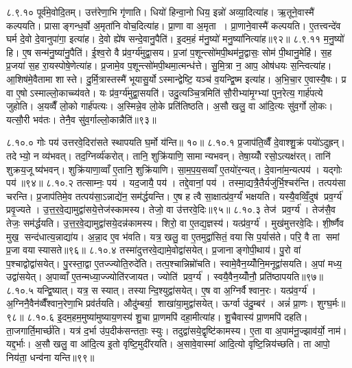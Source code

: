 ८.९.१०
पूर्व॑मे॒वोदि॒तम्। उत्त॑रेणा॒भि गृ॑णाति। धियो॑ हिन्वा॒नो धिय॒ इन्नो॑ अव्या॒दित्या॑ह। ऋ॒तूने॒वास्मै॑ कल्पयति। प्रासाङ्गन्ध॒र्वो अ॒मृता॑नि वोच॒दित्या॑ह। प्रा॒णा वा अ॒मृता। प्रा॒णाने॒वास्मै॑ कल्पयति। ए॒तत्त्वन्दे॑व घर्म दे॒वो दे॒वानुपा॑गा॒ इत्या॑ह। दे॒वो ह्ये॑ष सन्दे॒वानु॒पैति॑। इ॒दम॒हं म॑नु॒ष्यो॑ मनु॒ष्या॑नित्या॑ह॥९२॥
८.९.११
म॒नु॒ष्यो॑ हि। ए॒ष सन्म॑नु॒ष्या॑नु॒पैति॑। ई॒श्व॒रो वै प्र॑व॒र्ग्य॑मुद्वा॒सय\sn{}। प्र॒जां प॒शून्त्सो॑मपी॒थम॑नू॒द्वासः॒ सोम॑ पी॒थानु॒मेहि॑। स॒ह प्र॒जया॑ स॒ह रा॒यस्पोषे॒णेत्या॑ह। प्र॒जामे॒व प॒शून्त्सो॑मपी॒थमा॒त्मन्ध॑त्ते। सु॒मि॒त्रा न॒ आप॒ ओष॑धयः स॒न्त्वित्या॑ह। आ॒शिष॑मे॒वैतामा शास्ते। दु॒र्मि॒त्रास्तस्मै॑ भूयासु॒र्योऽस्मान्द्वेष्टि॒ यञ्च॑ व॒यन्द्वि॒ष्म इत्या॑ह। अ॒भि॒चा॒र ए॒वास्यै॒षः। प्र वा ए॒षोऽस्माल्लो॒काच्च्य॑वते। यः प्र॑व॒र्ग्य॑मुद्वा॒सयति॑। उदु॒त्यञ्चि॒त्रमिति॑ सौ॒रीभ्या॑मृ॒ग्भ्यां पुन॒रेत्य॒ गार्\mbox{}ह॑पत्ये जुहोति। अ॒यव्वैँ लो॒को गार्\mbox{}ह॑पत्यः। अ॒स्मिन्ने॒व लो॒के प्रति॑तिष्ठति। अ॒सौ खलु॒ वा आ॑दि॒त्यः सु॑व॒र्गो लो॒कः। यत्सौ॒री भव॑तः। तेनै॒व सु॑व॒र्गाल्लो॒कान्नैति॑॥९३॥
\anuvakamend

८.१०.०
गोः पय॑ उत्तरवे॒दिरा॑सते स्थापयति घ॒र्मो य॑न्ति॥ १०॥
८.१०.१
प्र॒जाप॑ति॒व्वैँ दे॒वाश्शु॒क्रं पयो॑ऽदुह्रन्। तदेभ्यो॒ न व्य॑भवत्। तद॒ग्निर्व्य॑करोत्। तानि॒ शुक्रि॑याणि॒ सामान्यभवन्। तेषा॒य्योँ रसो॒ऽत्यक्ष॑रत्। तानि॑ शुक्रय॒जूष्य॑भवन्। शुक्रि॑याणा॒व्वाँ ए॒तानि॒ शुक्रि॑याणि। सा॒म॒प॒य॒सव्वाँ ए॒तयो॑र॒न्यत्। दे॒वाना॑म॒न्यत्पय॑। यद्गोः पय॑॥९४॥
८.१०.२
तत्साम्नः॒ पय॑। यद॒जायै॒ पय॑। तद्दे॒वानां॒ पय॑। तस्मा॒द्यत्रै॒तैर्यजु॑र्भि॒श्चर॑न्ति। तत्पय॑सा चरन्ति। प्र॒जाप॑तिमे॒व तत्पय॑सा॒ऽन्नाद्ये॑न॒ सम॑र्द्धयन्ति। ए॒ष ह त्वै सा॒क्षात्प्र॑व॒र्ग्यं॑ भक्षयति। यस्यै॒वव्विँ॒दुष॑ प्रव॒र्ग्य॑ प्रवृ॒ज्यते। उ॒त्त॒र॒वे॒द्यामुद्वा॑सये॒त्तेज॑स्कामस्य। तेजो॒ वा उ॑त्तरवे॒दिः॥९५॥
८.१०.३
तेज॑ प्रव॒र्ग्य॑। तेज॑सै॒व तेजः॒ सम॑र्द्धयति। उ॒त्त॒र॒वे॒द्यामुद्वा॑सये॒दन्न॑कामस्य। शिरो॒ वा ए॒तद्य॒ज्ञस्य॑। यत्प्र॑व॒र्ग्य॑। मुख॑मुत्तरवे॒दिः। शी॒र्ष्णैव मुख॒ सन्द॑धात्य॒न्नाद्या॑य। अ॒न्ना॒द ए॒व भ॑वति। यत्र॒ खलु॒ वा ए॒तमुद्वा॑सितं॒ वयासि प॒र्यास॑ते। परि॒ वै ता समां प्र॒जा वयास्यासते॥९६॥
८.१०.४
तस्मा॑दुत्तरवे॒द्यामे॒वोद्वा॑सयेत्। प्र॒जानाङ्गोपी॒थाय॑। पु॒रो वा॑ प॒श्चाद्वोद्वा॑सयेत्। पु॒रस्ता॒द्वा ए॒तज्ज्योति॒रुदे॑ति। तत्प॒श्चान्निम्रो॑चति। स्वामे॒वैन॒य्योँनि॒मनूद्वा॑सयति। अ॒पां मध्य॒ उद्वा॑सयेत्। अ॒पाव्वाँ ए॒तन्मध्या॒ज्ज्योति॑रजायत। ज्योति॑ प्रव॒र्ग्य॑। स्वयै॒वैन॒य्योँनौ॒ प्रति॑ष्ठापयति॥९७॥
८.१०.५
यन्द्वि॒ष्यात्। यत्र॒ स स्यात्। तस्यान्दि॒श्युद्वा॑सयेत्। ए॒ष वा अ॒ग्निर्वैश्वान॒रः। यत्प्र॑व॒र्ग्य॑। अ॒ग्निनै॒वैन॑व्वैँश्वान॒रेणा॒भि प्रव॑र्तयति। औदु॑म्बर्या॒ शाखा॑या॒मुद्वा॑सयेत्। ऊर्ग्वा उ॑दु॒म्बर॑। अन्नं॑ प्रा॒णः। शुग्घ॒र्मः॥९८॥
८.१०.६
इ॒दम॒हम॒मुष्या॑मुष्याय॒णस्य॑ शु॒चा प्रा॒णमपि॑ दहा॒मीत्या॑ह। शु॒चैवास्य॑ प्रा॒णमपि॑ दहति। ता॒जगार्ति॒मार्च्छ॑ति। यत्र॑ द॒र्भा उ॑प॒दीक॑सन्तताः॒ स्युः। तदुद्वा॑सये॒द्वृष्टि॑कामस्य। ए॒ता वा अ॒पाम॑नू॒ज्झाव॑र्यो॒ नाम॑। यद्द॒र्भाः। अ॒सौ खलु॒ वा आ॑दि॒त्य इ॒तो वृष्टि॒मुदी॑रयति। अ॒सावे॒वास्मा॑ आदि॒त्यो वृष्टि॒न्निय॑च्छति। ता आपो॒ निय॑ता॒ धन्व॑ना यन्ति॥९९॥
\anuvakamend

